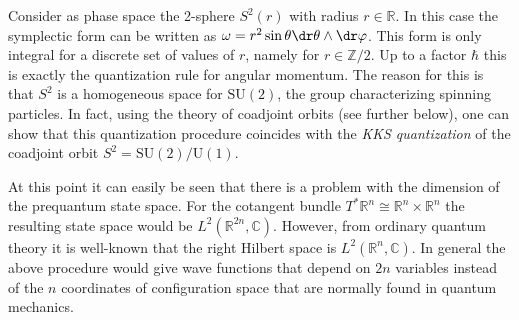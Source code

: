 
    \begin{example}
        Consider as phase space the 2-sphere $S^2(r)$ with radius $r\in\mathbb{R}$. In this case the symplectic form can be written as $\omega=r^2\sin\theta\dr\theta\wedge\dr\varphi$. This form is only integral for a discrete set of values of $r$, namely for $r\in\mathbb{Z}/2$. Up to a factor $\hbar$ this is exactly the quantization rule for angular momentum. The reason for this is that $S^2$ is a homogeneous space for $\mathrm{SU}(2)$, the group characterizing spinning particles. In fact, using the theory of coadjoint orbits (see further below), one can show that this quantization procedure coincides with the \textit{KKS quantization} of the coadjoint orbit $S^2=\mathrm{SU}(2)/\mathrm{U}(1)$.
    \end{example}

    At this point it can easily be seen that there is a problem with the dimension of the prequantum state space. For the cotangent bundle $T^*\mathbb{R}^n\cong\mathbb{R}^n\times\mathbb{R}^n$ the resulting state space would be $L^2(\mathbb{R}^{2n},\mathbb{C})$. However, from ordinary quantum theory it is well-known that the right Hilbert space is $L^2(\mathbb{R}^n,\mathbb{C})$. In general the above procedure would give wave functions that depend on $2n$ variables instead of the $n$ coordinates of configuration space that are normally found in quantum mechanics.

